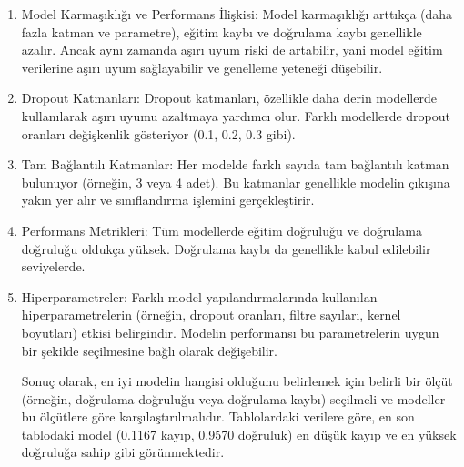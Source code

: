 \documentclass[12pt,a4paper]{article}
\begin{document}
\begin{enumerate}
\begin{enumerate}
\begin{enumerate}
	\item Model Karmaşıklığı ve Performans İlişkisi: Model karmaşıklığı arttıkça (daha fazla katman ve parametre), eğitim kaybı ve doğrulama kaybı genellikle azalır. Ancak aynı zamanda aşırı uyum riski de artabilir, yani model eğitim verilerine aşırı uyum sağlayabilir ve genelleme yeteneği düşebilir.
	
	\item Dropout Katmanları: Dropout katmanları, özellikle daha derin modellerde kullanılarak aşırı uyumu azaltmaya yardımcı olur. Farklı modellerde dropout oranları değişkenlik gösteriyor (0.1, 0.2, 0.3 gibi).
	
	\item Tam Bağlantılı Katmanlar: Her modelde farklı sayıda tam bağlantılı katman bulunuyor (örneğin, 3 veya 4 adet). Bu katmanlar genellikle modelin çıkışına yakın yer alır ve sınıflandırma işlemini gerçekleştirir.
	
	\item Performans Metrikleri: Tüm modellerde eğitim doğruluğu ve doğrulama doğruluğu oldukça yüksek. Doğrulama kaybı da genellikle kabul edilebilir seviyelerde.
	
	\item Hiperparametreler: Farklı model yapılandırmalarında kullanılan hiperparametrelerin (örneğin, dropout oranları, filtre sayıları, kernel boyutları) etkisi belirgindir. Modelin performansı bu parametrelerin uygun bir şekilde seçilmesine bağlı olarak değişebilir.
	
	Sonuç olarak, en iyi modelin hangisi olduğunu belirlemek için belirli bir ölçüt (örneğin, doğrulama doğruluğu veya doğrulama kaybı) seçilmeli ve modeller bu ölçütlere göre karşılaştırılmalıdır. Tablolardaki verilere göre, en son tablodaki model (0.1167 kayıp, 0.9570 doğruluk) en düşük kayıp ve en yüksek doğruluğa sahip gibi görünmektedir.
		
\end{enumerate}


\end{enumerate}
\end{enumerate}
\end{document}
